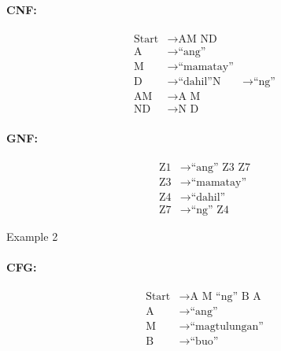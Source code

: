 \paragraph{CNF:}
\begin{equation*}
    \begin{aligned}
        \text{Start}   & \rightarrow \text{AM ND}   \\
        \text{A} & \rightarrow \text{“ang”} \\
        \text{M} & \rightarrow \text{“mamatay”} \\
        \text{D} & \rightarrow \text{“dahil”}
        \text{N} & \rightarrow \text{“ng”} \\
        \text{AM} & \rightarrow \text{A M} \\
        \text{ND} & \rightarrow \text{N D}
    \end{aligned}
\end{equation*}

\paragraph{GNF:}
\begin{equation*}
    \begin{aligned}
        \text{Z1}   & \rightarrow \text{“ang” Z3 Z7}   \\
        \text{Z3} & \rightarrow \text{“mamatay”} \\
        \text{Z4} & \rightarrow \text{“dahil”} \\
        \text{Z7} & \rightarrow \text{“ng” Z4}
    \end{aligned}
\end{equation*}

Example 2
\paragraph{CFG:}
\begin{equation*}
    \begin{aligned}
        \text{Start}   & \rightarrow \text{A M “ng” B A}   \\
        \text{A} & \rightarrow \text{“ang”} \\
        \text{M} & \rightarrow \text{“magtulungan”} \\
        \text{B} & \rightarrow \text{“buo”}
    \end{aligned}
\end{equation*}

